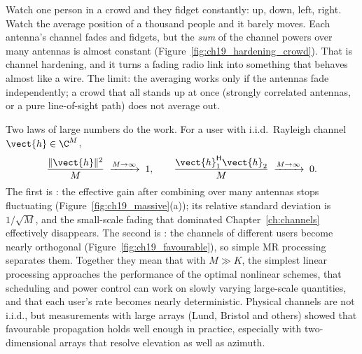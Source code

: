 \begin{analogy}
Watch one person in a crowd and they fidget constantly: up, down, left, right. Watch the average
position of a thousand people and it barely moves. Each antenna's channel fades and fidgets, but
the \emph{sum} of the channel powers over many antennas is almost constant
(Figure~\ref{fig:ch19_hardening_crowd}). That is channel hardening, and it turns a fading radio
link into something that behaves almost like a wire. The limit: the averaging works only if the
antennas fade independently; a crowd that all stands up at once (strongly correlated antennas, or a
pure line-of-sight path) does not average out.
\end{analogy}

Two laws of large numbers do the work. For a user with i.i.d.\ Rayleigh channel $\vect{h}\in\C^M$,
\begin{equation}
\frac{\|\vect{h}\|^2}{M}\;\xrightarrow{M\to\infty}\;1,
\qquad
\frac{\vect{h}_1^{\mathsf H}\vect{h}_2}{M}\;\xrightarrow{M\to\infty}\;0 .
\label{eq:ch19:hardening}
\end{equation}
The first is : the effective gain after combining over many antennas stops
fluctuating (Figure~\ref{fig:ch19_massive}(a)); its relative standard deviation is $1/\sqrt{M}$, and
the small-scale fading that dominated Chapter~\ref{ch:channels} effectively disappears. The second
is : the channels of different users become nearly orthogonal
(Figure~\ref{fig:ch19_favourable}), so simple MR processing separates them. Together they mean that
with $M\gg K$, the simplest linear processing approaches the performance of the optimal nonlinear
schemes, that scheduling and power control can work on slowly varying large-scale quantities, and
that each user's rate becomes nearly deterministic. Physical channels are not i.i.d., but
measurements with large arrays (Lund, Bristol and others) showed that favourable propagation holds
well enough in practice, especially with two-dimensional arrays that resolve elevation as well as
azimuth.


